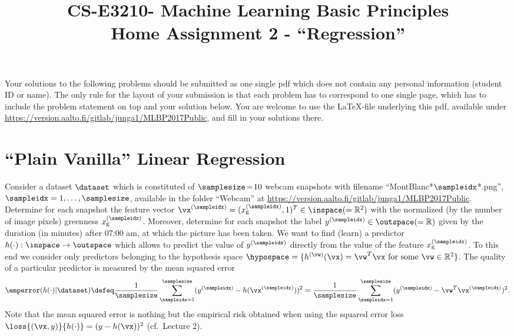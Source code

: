 \documentclass[article,11pt]{article}
\title{CS-E3210- Machine Learning Basic Principles \\ Home Assignment 2 - ``Regression''}
\begin{document}
\date{}
\maketitle

Your solutions to the following problems should be submitted as one single pdf which does not contain 
any personal information (student ID or name). The only rule for the layout of your submission is that 
each problem has to correspond to one single page, which has to include the problem statement on top 
and your solution below. You are welcome to use the \LaTeX-file underlying this pdf, 
available under \url{https://version.aalto.fi/gitlab/junga1/MLBP2017Public}, and fill in your solutions there. 

\newpage
\section{``Plain Vanilla'' Linear Regression}
\label{problem_1_1}

Consider a dataset $\dataset$ which is constituted of $\samplesize\!=\!10$ webcam snapshots with filename 
``MontBlanc*$\sampleidx$*.png'', $\sampleidx=1,\ldots,\samplesize$, available in the folder ``Webcam'' at \url{https://version.aalto.fi/gitlab/junga1/MLBP2017Public}. 
Determine for each snapshot the feature vector $\vx^{(\sampleidx)}=(x_{\rm g}^{(\sampleidx)},1)^{T} \in \inspace (= \mathbb{R}^{2})$ with the normalized (by the number of image pixels) greenness $x_{\rm g}^{(\sampleidx)}$. 
Moreover, determine for each snapshot the label $y^{(\sampleidx)} \in \outspace (=\mathbb{R})$ given by the duration (in minutes) after 07:00 am, at which the picture has been taken. 
We want to find (learn) a predictor $h(\cdot): \inspace \rightarrow \outspace$ which allows to predict the value of $y^{(\sampleidx)}$ directly from 
the value of the feature $x_{\rm g}^{(\sampleidx)}$. To this end we consider only predictors belonging to the hypothesis space 
$\hypospace = \{h^{(\vw)}(\vx) = \vw^{T} \vx \mbox{ for some } \vw \in \mathbb{R}^{2}\}$. 
The quality of a particular predictor is measured by the mean squared error 
\vspace*{-3mm}
\begin{equation} \label{eq:1}
 \emperror(h(\cdot) | \dataset) \defeq  \frac{1}{\samplesize}\sum^{\samplesize}_{\sampleidx=1}(y^{(\sampleidx)} - h(\vx^{(\sampleidx)}))^2= \frac{1}{\samplesize}\sum^{\samplesize}_{\sampleidx=1}(y^{(\sampleidx)} - \vw^{T} \vx^{(\sampleidx)})^2.
\vspace*{-2mm}
\end{equation} 
Note that the mean squared error is nothing but the empirical risk obtained when using the squared error loss $\loss{(\vx,y)}{h(\cdot)} = (y - h(\vx))^{2}$ (cf.\ Lecture 2). 
\end{document}
